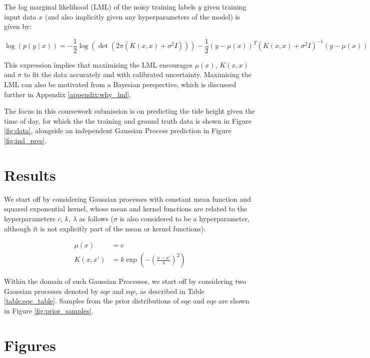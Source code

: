 \documentclass{article}
\begin{document}
The log marginal likelihood (LML) of the noisy training labels $y$ given training input data $x$ (and also implicitly given any hyperparameters of the model) is given by:

\begin{equation}
    \log \left( p(y \mid x) \right) = -\frac{1}{2}\log\left(\det \left(2\pi\left( K(x, x) + \sigma^2 I \right)\right)\right) -\frac{1}{2}(y - \mu(x))^T \left( K(x, x) + \sigma^2 I \right)^{-1} (y - \mu(x))
\end{equation}

This expression implies that maximising the LML encourages $\mu(x)$, $K(x,x)$ and $\sigma$ to fit the data accurately and with calibrated uncertainty. Maximising the LML can also be motivated from a Bayesian perspective, which is discussed further in Appendix \ref{appendix:why_lml}.

The focus in this coursework submission is on predicting the tide height given the time of day, for which the the training and ground truth data is shown in Figure \ref{fig:data}, alongside an independent Gaussian Process prediction in Figure \ref{fig:ind_pres}.

\section{Results}

We start off by considering Gaussian processes with constant mean function and squared exponential kernel, whose mean and kernel functions are related to the hyperparameters $c$, $k$, $\lambda$ as follows ($\sigma$ is also considered to be a hyperparameter, although it is not explicitly part of the mean or kernel functions):

\begin{align}
\mu(x) &= c \\
K(x, x') &= k \exp\left( -\left( \frac{x - x'}{\lambda} \right)^2 \right)
\end{align}

Within the domain of such Gaussian Processes, we start off by considering two Gaussian processes denoted by sqe and sqe, as described in Table \ref{table:sqe_table}. Samples from the prior distributions of sqe and sqe are shown in Figure \ref{fig:prior_samples}.


\appendix

\section{Figures}\label{appendix:figures}
\end{document}
